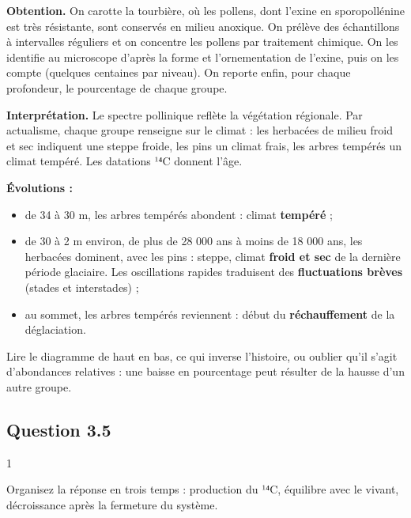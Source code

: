 \documentclass[11pt,a4paper]{article}
\providecommand{\tightlist}{\setlength{\itemsep}{0pt}\setlength{\parskip}{0pt}}
\begin{document}
\textbf{Obtention.} On carotte la tourbière, où les pollens, dont l'exine en sporopollénine est très résistante, sont conservés en milieu anoxique. On prélève des échantillons à intervalles réguliers et on concentre les pollens par traitement chimique. On les identifie au microscope d'après la forme et l'ornementation de l'exine, puis on les compte (quelques centaines par niveau). On reporte enfin, pour chaque profondeur, le pourcentage de chaque groupe.

\textbf{Interprétation.} Le spectre pollinique reflète la végétation régionale. Par actualisme, chaque groupe renseigne sur le climat : les herbacées de milieu froid et sec indiquent une steppe froide, les pins un climat frais, les arbres tempérés un climat tempéré. Les datations ¹⁴C donnent l'âge.

\textbf{Évolutions :}

\begin{itemize}
\tightlist
\item
  de 34 à 30 m, les arbres tempérés abondent : climat \textbf{tempéré} ;
\item
  de 30 à 2 m environ, de plus de 28 000 ans à moins de 18 000 ans, les herbacées dominent, avec les pins : steppe, climat \textbf{froid et sec} de la dernière période glaciaire. Les oscillations rapides traduisent des \textbf{fluctuations brèves} (stades et interstades) ;
\item
  au sommet, les arbres tempérés reviennent : début du \textbf{réchauffement} de la déglaciation.
\end{itemize}

\begin{piege}

Lire le diagramme de haut en bas, ce qui inverse l'histoire, ou oublier qu'il s'agit d'abondances relatives : une baisse en pourcentage peut résulter de la hausse d'un autre groupe.

\end{piege}

\hypertarget{question-3.5}{%
\subsection{Question 3.5}\label{question-3.5}}

\begin{indication}{1}

Organisez la réponse en trois temps : production du ¹⁴C, équilibre avec le vivant, décroissance après la fermeture du système.

\end{indication}
\end{document}
